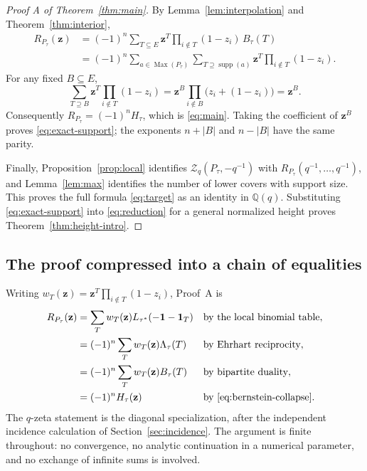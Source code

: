 \documentclass[11pt]{article}
\numberwithin{equation}{section}
\theoremstyle{definition}
\theoremstyle{remark}
\newcommand{\Q}{\mathbb Q}
\newcommand{\one}{\mathbf 1}
\newcommand{\supp}{\operatorname{supp}}
\newcommand{\Max}{\operatorname{Max}}
\newcommand{\Zeta}{\mathcal Z}
\newcommand{\zt}[1]{\mathbf z^{#1}}
\newcommand{\omitprod}[1]{\prod_{i\notin #1}(1-z_i)}
\begin{document}
\begin{proof}[Proof A of Theorem~\ref{thm:main}]
By Lemma~\ref{lem:interpolation} and Theorem~\ref{thm:interior},
\begin{align*}
 R_{P_\tau}(\mathbf z)
 &=(-1)^n\sum_{T\subseteq E}\zt T\omitprod T\,B_\tau(T)\\
 &=(-1)^n\sum_{a\in\Max(P_\tau)}
   \sum_{T\supseteq\supp(a)}\zt T\omitprod T.
\end{align*}
For any fixed $B\subseteq E$,
\begin{equation}
 \sum_{T\supseteq B}\zt T\omitprod T
 =\zt B\prod_{i\notin B}\bigl(z_i+(1-z_i)\bigr)=\zt B.
 \label{eq:bernstein-collapse}
\end{equation}
Consequently $R_{P_\tau}=(-1)^nH_\tau$, which is \eqref{eq:main}. Taking the
coefficient of $\zt B$ proves \eqref{eq:exact-support}; the exponents $n+|B|$
and $n-|B|$ have the same parity.

Finally, Proposition~\ref{prop:local} identifies $\Zeta_q(P_\tau,-q^{-1})$
with $R_{P_\tau}(q^{-1},\ldots,q^{-1})$, and Lemma~\ref{lem:max} identifies
the number of lower covers with support size. This proves the full formula
\eqref{eq:target} as an identity in $\Q(q)$. Substituting
\eqref{eq:exact-support} into \eqref{eq:reduction} for a general normalized
height proves Theorem~\ref{thm:height-intro}.
\end{proof}

\subsection{The proof compressed into a chain of equalities}

Writing $w_T(\mathbf z)=\zt T\prod_{i\notin T}(1-z_i)$, Proof~A is
\begin{align*}
 R_{P_\tau}(\mathbf z)
 &=\sum_T w_T(\mathbf z)L_{\tau^*}(-\one-\one_T)
 &&\text{by the local binomial table},\\
 &=(-1)^n\sum_Tw_T(\mathbf z)\Lambda_\tau(T)
 &&\text{by Ehrhart reciprocity},\\
 &=(-1)^n\sum_Tw_T(\mathbf z)B_\tau(T)
 &&\text{by bipartite duality},\\
 &=(-1)^nH_\tau(\mathbf z)
 &&\text{by \eqref{eq:bernstein-collapse}}.
\end{align*}
The $q$-zeta statement is the diagonal specialization, after the independent
incidence calculation of Section~\ref{sec:incidence}. The argument is finite
throughout: no convergence, no analytic continuation in a numerical parameter,
and no exchange of infinite sums is involved.
\end{document}
